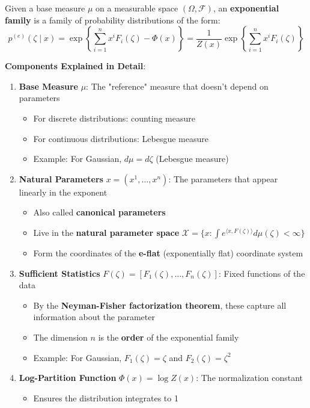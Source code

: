 \documentclass{amsart}
\theoremstyle{plain}
\theoremstyle{definition}
\theoremstyle{remark}
\begin{document}
Given a base measure $\mu$ on a measurable space $(\Omega, \mathcal{F})$, an \textbf{exponential family} is a family of probability distributions of the form:
\[
p^{(e)}(\zeta \mid x) = \exp \left\{  \sum_{i=1}^{n} x^{i}F_i(\zeta) - \Phi(x) \right\} = \frac{1}{Z(x)}\exp \left\{  \sum_{i=1}^{n} x^{i}F_i(\zeta)  \right\}
\]

\textbf{Components Explained in Detail}:

\begin{enumerate}
	\item \textbf{Base Measure} $\mu$: The "reference" measure that doesn't depend on parameters
	\begin{itemize}
		\item For discrete distributions: counting measure
		\item For continuous distributions: Lebesgue measure
		\item Example: For Gaussian, $d\mu = d\zeta$ (Lebesgue measure)
	\end{itemize}
	\item \textbf{Natural Parameters} $x = (x^1, \ldots, x^n)$: The parameters that appear linearly in the exponent
	\begin{itemize}
		\item Also called \textbf{canonical parameters}
		\item Live in the \textbf{natural parameter space} $\mathcal{X} = \{x : \int e^{\langle x, F(\zeta) \rangle} d\mu(\zeta) < \infty\}$
		\item Form the coordinates of the \textbf{e-flat} (exponentially flat) coordinate system
	\end{itemize}
	\item \textbf{Sufficient Statistics} $F(\zeta) = [F_1(\zeta), \ldots, F_n(\zeta)]$: Fixed functions of the data
	\begin{itemize}
		\item By the \textbf{Neyman-Fisher factorization theorem}, these capture all information about the parameter
		\item The dimension $n$ is the \textbf{order} of the exponential family
		\item Example: For Gaussian, $F_1(\zeta) = \zeta$ and $F_2(\zeta) = \zeta^2$
	\end{itemize}
	\item \textbf{Log-Partition Function} $\Phi(x) = \log Z(x)$: The normalization constant
	\begin{itemize}
		\item Ensures the distribution integrates to 1

\end{itemize}
\end{enumerate}
\end{document}
